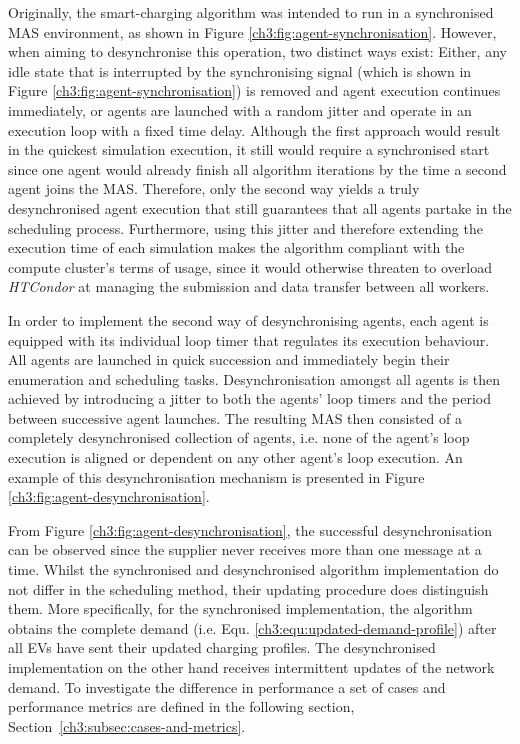 Originally, the smart-charging algorithm was intended to run in a synchronised MAS environment, as shown in Figure \ref{ch3:fig:agent-synchronisation}.
However, when aiming to desynchronise this operation, two distinct ways exist:
Either, any idle state that is interrupted by the synchronising signal (which is shown in Figure \ref{ch3:fig:agent-synchronisation}) is removed and agent execution continues immediately, or agents are launched with a random jitter and operate in an execution loop with a fixed time delay.
Although the first approach would result in the quickest simulation execution, it still would require a synchronised start since one agent would already finish all algorithm iterations by the time a second agent joins the MAS.
Therefore, only the second way yields a truly desynchronised agent execution that still guarantees that all agents partake in the scheduling process.
Furthermore, using this jitter and therefore extending the execution time of each simulation makes the algorithm compliant with the compute cluster's terms of usage, since it would otherwise threaten to overload \textit{HTCondor} at managing the submission and data transfer between all workers.

In order to implement the second way of desynchronising agents, each agent is equipped with its individual loop timer that regulates its execution behaviour.
All agents are launched in quick succession and immediately begin their enumeration and scheduling tasks.
Desynchronisation amongst all agents is then achieved by introducing a jitter to both the agents' loop timers and the period between successive agent launches.
The resulting MAS then consisted of a completely desynchronised collection of agents, i.e. none of the agent's loop execution is aligned or dependent on any other agent's loop execution.
An example of this desynchronisation mechanism is presented in Figure \ref{ch3:fig:agent-desynchronisation}.



From Figure \ref{ch3:fig:agent-desynchronisation}, the successful desynchronisation can be observed since the supplier never receives more than one message at a time.
Whilst the synchronised and desynchronised algorithm implementation do not differ in the scheduling method, their updating procedure does distinguish them.
More specifically, for the synchronised implementation, the algorithm obtains the complete demand (i.e. Equ. \ref{ch3:equ:updated-demand-profile}) after all EVs have sent their updated charging profiles.
The desynchronised implementation on the other hand receives intermittent updates of the network demand.
To investigate the difference in performance a set of cases and performance metrics are defined in the following section, Section~\ref{ch3:subsec:cases-and-metrics}.


